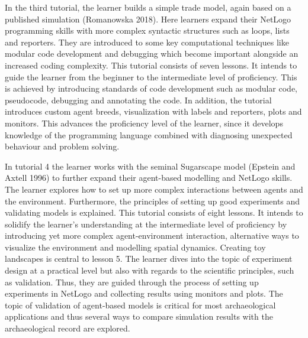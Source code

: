 \documentclass[
]{article}
\begin{document}
In the third tutorial, the learner builds a simple trade model, again based on a published simulation (Romanowska 2018). Here learners expand their NetLogo programming skills with more complex syntactic structures such as loops, lists and reporters. They are introduced to some key computational techniques like modular code development and debugging which become important alongside an increased coding complexity. This tutorial consists of seven lessons. It intends to guide the learner from the beginner to the intermediate level of proficiency. This is achieved by introducing standards of code development such as modular code, pseudocode, debugging and annotating the code. In addition, the tutorial introduces custom agent breeds, visualization with labels and reporters, plots and monitors. This advances the proficiency level of the learner, since it develops knowledge of the programming language combined with diagnosing unexpected behaviour and problem solving.

In tutorial 4 the learner works with the seminal Sugarscape model (Epstein and Axtell 1996) to further expand their agent-based modelling and NetLogo skills. The learner explores how to set up more complex interactions between agents and the environment. Furthermore, the principles of setting up good experiments and validating models is explained. This tutorial consists of eight lessons. It intends to solidify the learner's understanding at the intermediate level of proficiency by introducing yet more complex agent-environment interaction, alternative ways to visualize the environment and modelling spatial dynamics. Creating toy landscapes is central to lesson 5. The learner dives into the topic of experiment design at a practical level but also with regards to the scientific principles, such as validation. Thus, they are guided through the process of setting up experiments in NetLogo and collecting results using monitors and plots. The topic of validation of agent-based models is critical for most archaeological applications and thus several ways to compare simulation results with the archaeological record are explored.
\end{document}
